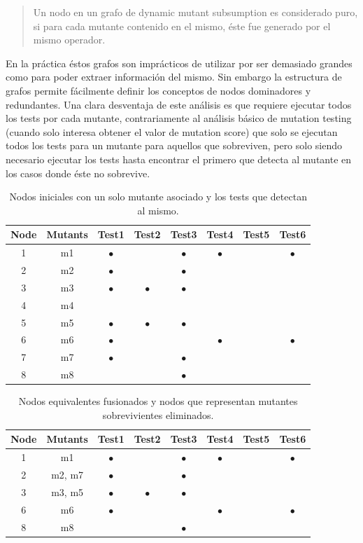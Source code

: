 \begin{quote}
	Un nodo en un grafo de dynamic mutant subsumption es considerado puro, si para cada mutante contenido en el mismo, \'este fue generado por el mismo operador.
\end{quote}
En la pr\'actica \'estos grafos son impr\'acticos de utilizar por ser demasiado grandes como para poder extraer informaci\'on del mismo. Sin embargo la estructura de grafos permite f\'acilmente definir los conceptos de nodos dominadores y redundantes.
Una clara desventaja de este an\'alisis es que requiere ejecutar todos los tests por cada mutante, contrariamente al an\'alisis b\'asico de mutation testing (cuando solo interesa obtener el valor de mutation score) que solo se ejecutan todos los tests para un mutante para aquellos que sobreviven, pero solo siendo necesario ejecutar los tests hasta encontrar el primero que detecta al mutante en los casos donde \'este no sobrevive.

\begin{table}[]
	\begin{tabular}{|cccccccc|}
		\hline
		Node & Mutants & Test1 & Test2 & Test3 & Test4 & Test5 & Test6 \\ \hline
		1 & m1 & $\bullet$ &  & $\bullet$ & $\bullet$ &  & $\bullet$ \\ \hline
		2 & m2 & $\bullet$ &  & $\bullet$ &  &  &  \\ \hline
		3 & m3 & $\bullet$ & $\bullet$ & $\bullet$ &  &  &  \\ \hline
		4 & m4 &  &  &  &  &  &  \\ \hline
		5 & m5 & $\bullet$ & $\bullet$ & $\bullet$ &  &  &  \\ \hline
		6 & m6 & $\bullet$ &  &  & $\bullet$ &  & $\bullet$ \\ \hline
		7 & m7 & $\bullet$ &  & $\bullet$ &  &  &  \\ \hline
		8 & m8 &  &  & $\bullet$ &  &  &  \\ \hline
	\end{tabular}
	\caption{Nodos iniciales con un solo mutante asociado y los tests que detectan al mismo.}
	\label{tables.examples.subsumptionInit}
\end{table}

\begin{table}[]
	\begin{tabular}{|cccccccc|}
		\hline
		Node & Mutants & Test1 & Test2 & Test3 & Test4 & Test5 & Test6 \\ \hline
		1 & m1 & $\bullet$ &  & $\bullet$ & $\bullet$ &  & $\bullet$ \\ \hline
		2 & m2, m7 & $\bullet$ &  & $\bullet$ &  &  &  \\ \hline
		3 & m3, m5 & $\bullet$ & $\bullet$ & $\bullet$ &  &  &  \\ \hline
		6 & m6 & $\bullet$ &  &  & $\bullet$ &  & $\bullet$ \\ \hline
		8 & m8 &  &  & $\bullet$ &  &  &  \\ \hline
	\end{tabular}
	\caption{Nodos equivalentes fusionados y nodos que representan mutantes sobrevivientes eliminados.}
	\label{tables.examples.subsumptionEquivAndKilled}
\end{table}

